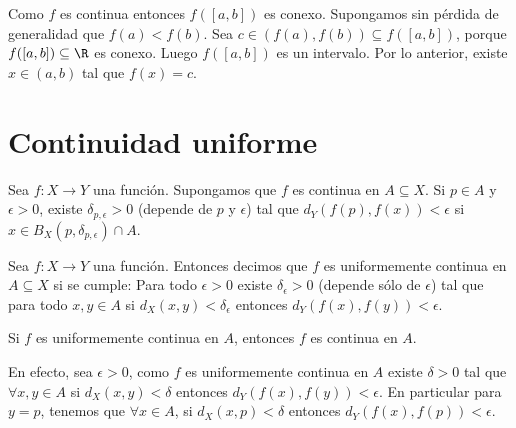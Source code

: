 \begin{dem}
Como $f$ es continua entonces $f([a,b])$ es conexo. %
Supongamos sin pérdida de generalidad que $f(a) < f(b)$. %
Sea $c \in (f(a), f(b)) \subseteq f([a,b])$, porque $f([a,b]) \subseteq \R$ es conexo. %
Luego $f([a,b])$ es un intervalo. %
Por lo anterior, existe $x \in (a,b)$ tal que $f(x) = c$. %
\end{dem}

\section*{Continuidad uniforme} %

\begin{remark}
Sea $f: X \to Y$ una función. Supongamos que $f$ es continua en $A \subseteq X$. %
Si $p \in A$ y $\epsilon > 0$, existe $\delta_{p,\epsilon} > 0$ (depende de $p$ y $\epsilon$) %
tal que $d_Y(f(p), f(x)) < \epsilon$ si $x \in B_X(p, \delta_{p,\epsilon}) \cap A$. %
\end{remark}

\begin{definicion}
Sea $f: X \to Y$ una función. Entonces decimos que $f$ es uniformemente continua en $A \subseteq X$ si se cumple: %
Para todo $\epsilon > 0$ existe $\delta_{\epsilon} > 0$ (depende sólo de $\epsilon$) tal que %
para todo $x, y \in A$ si $d_X(x, y) < \delta_{\epsilon}$ entonces $d_Y(f(x), f(y)) < \epsilon$. %
\end{definicion}

\begin{remark}
Si $f$ es uniformemente continua en $A$, entonces $f$ es continua en $A$. %
\end{remark}

\begin{dem}
En efecto, sea $\epsilon > 0$, como $f$ es uniformemente continua en $A$ existe $\delta > 0$ tal que %
$\forall x,y \in A$ si $d_X(x,y) < \delta$ entonces $d_Y(f(x), f(y)) < \epsilon$. %
En particular para $y = p$, tenemos que $\forall x \in A$, %
si $d_X(x,p) < \delta$ entonces $d_Y(f(x), f(p)) < \epsilon$. %
\end{dem}

